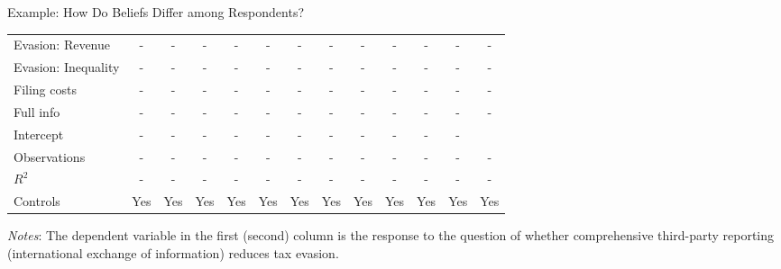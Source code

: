 \documentclass{beamer}
\begin{document}
\begin{frame}{Example: How Do Beliefs Differ among Respondents?}
\begin{table}[!htbp]
\begin{threeparttable}
\begin{tabular}{l|cc|cc|cc|cc|cc|cc}
Evasion: Revenue        & - & - & - & - & - & -& - & - & - & -& - & -  \\
Evasion: Inequality     & - & - & - & - & - & -& - & - & - & -& - & -  \\
Filing costs            & - & - & - & - & - & -& - & - & - & -& - & -  \\
Full info               & - & - & - & - & - & -& - & - & - & -& - & -  \\[0.5em]
\midrule
Intercept &- &- &- &- &- &- &- &- &-&- &- \\
Observations                        &-    &-    &-    &-    &-    &- &-    &-    &-    &-&-    &-       \\
$R^2$                               &-    &-    &-    &-    &-    &- &-    &-    &-    &-&-    &-       \\
Controls                 & Yes     & Yes    & Yes    & Yes     & Yes    & Yes & Yes    & Yes     & Yes    & Yes  & Yes    & Yes         \\
\bottomrule
\end{tabular}
\begin{tablenotes}[flushleft]
\item \textit{Notes}: The dependent variable in the first (second) column is the response to the question of whether comprehensive third-party reporting (international exchange of information) reduces tax evasion. 
\end{tablenotes}
\end{threeparttable}
\end{table}
\hfill \hyperlink{posttreatment}{}
\end{frame}
\end{document}
